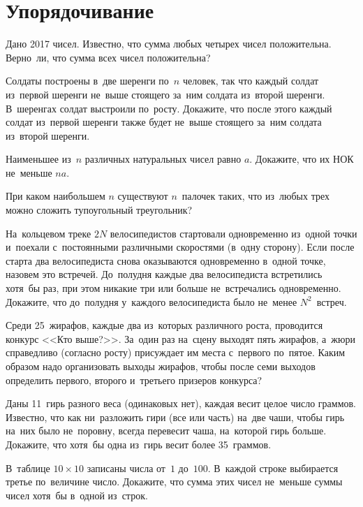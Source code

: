 
\section*{Упорядочивание}


\begin{problems}

\item
Дано 2017 чисел.
Известно, что сумма любых четырех чисел положительна.
Верно~ли, что сумма всех чисел положительна?

\item
Солдаты построены в~две шеренги по~$n$ человек, так что каждый солдат из~первой
шеренги не~выше стоящего за~ним солдата из~второй шеренги.
В~шеренгах солдат выстроили по~росту.
Докажите, что после этого каждый солдат из~первой шеренги также будет не~выше
стоящего за~ним солдата из~второй шеренги.

\item
Наименьшее из~$n$ различных натуральных чисел равно $a$.
Докажите, что их НОК не~меньше $na$.

\item
При каком наибольшем $n$ существуют $n$~палочек таких, что из~любых трех можно
сложить тупоугольный треугольник?

\item
На~кольцевом треке $2 N$ велосипедистов стартовали одновременно из~одной точки
и~поехали с~постоянными различными скоростями (в~одну сторону).
Если после старта два велосипедиста снова оказываются одновременно в~одной
точке, назовем это встречей.
До~полудня каждые два велосипедиста встретились хотя~бы раз, при этом никакие
три или больше не~встречались одновременно.
Докажите, что до~полудня у~каждого велосипедиста было не~менее $N^2$~встреч.

\item
Среди 25~жирафов, каждые два из~которых различного роста, проводится конкурс
<<Кто выше?>>.
За~один раз на~сцену выходят пять жирафов, а~жюри справедливо (согласно росту)
присуждает им места с~первого по~пятое.
Каким образом надо организовать выходы жирафов, чтобы после семи выходов
определить первого, второго и~третьего призеров конкурса?

\item
Даны 11~гирь разного веса (одинаковых нет), каждая весит целое число граммов.
Известно, что как ни~разложить гири (все или часть) на~две чаши, чтобы гирь
на~них было не~поровну, всегда перевесит чаша, на~которой гирь больше.
Докажите, что хотя~бы одна из~гирь весит более 35~граммов.

\item
В~таблице $10 \times 10$ записаны числа от~$1$ до~$100$.
В~каждой строке выбирается третье по~величине число.
Докажите, что сумма этих чисел не~меньше суммы чисел хотя~бы в~одной из~строк.

\end{problems}

